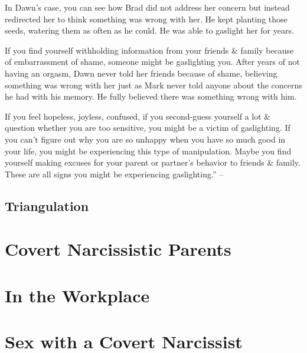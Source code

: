 \documentclass{article}
\numberwithin{equation}{section}
\begin{document}
In Dawn's case, you can see how Brad did not address her concern but instead redirected her to think something was wrong with her. He kept planting those seeds, watering them as often as he could. He was able to gaslight her for years.

If you find yourself withholding information from your friends \& family because of embarrassment of shame, someone might be gaslighting you. After years of not having an orgasm, Dawn never told her friends because of shame, believing something was wrong with her just as Mark never told anyone about the concerns he had with his memory. He fully believed there was something wrong with him.

If you feel hopeless, joyless, confused, if you second-guess yourself a lot \& question whether you are too sensitive, you might be a victim of gaslighting. If you can't figure out why you are so unhappy when you have so much good in your life, you might be experiencing this type of manipulation. Maybe you find yourself making excuses for your parent or partner's behavior to friends \& family. These are all signs you might be experiencing gaslighting.'' -- \cite[p. 73--75]{Mirza2017}

\subsection{Triangulation}


\section{Covert Narcissistic Parents}


\section{In the Workplace}


\section{Sex with a Covert Narcissist}

\end{document}
